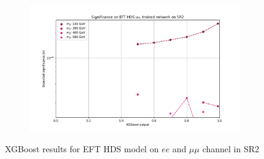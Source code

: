 \documentclass[12pt, a4paper]{book}
\begin{document}
\begin{figure}[!ht]
\begin{subfigure}[b]{0.49\textwidth}
   \end{subfigure}
   \hfill
   \begin{subfigure}[b]{0.49\textwidth}
      \centering
      \includegraphics[width=1\textwidth]{XGBoost/Model_independent/100-150/EFT_HDS/EXP_SIG_uu.pdf}
   \end{subfigure}
   \caption{XGBoost results for EFT HDS model on $ee$ and $\mu\mu$ channel in SR2}\label{fig:EFT_HDS_SR2}
\end{figure}
\end{document}
